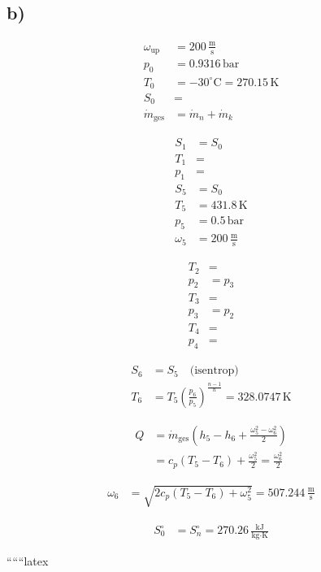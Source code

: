 

\subsection*{b)}

\begin{align*}
    \omega_{\text{up}} &= 200 \, \frac{\text{m}}{\text{s}} \\
    p_0 &= 0.9316 \, \text{bar} \\
    T_0 &= -30^\circ \text{C} = 270.15 \, \text{K} \\
    S_0 &= \\
    \dot{m}_{\text{ges}} &= \dot{m}_n + \dot{m}_k
\end{align*}

\begin{align*}
    S_1 &= S_0 \\
    T_1 &= \\
    p_1 &= \\
    S_5 &= S_0 \\
    T_5 &= 431.8 \, \text{K} \\
    p_5 &= 0.5 \, \text{bar} \\
    \omega_5 &= 200 \, \frac{\text{m}}{\text{s}}
\end{align*}

\begin{align*}
    T_2 &= \\
    p_2 &= p_3 \\
    T_3 &= \\
    p_3 &= p_2 \\
    T_4 &= \\
    p_4 &= 
\end{align*}

\begin{align*}
    S_6 &= S_5 \quad \text{(isentrop)} \\
    T_6 &= T_5 \left( \frac{p_6}{p_5} \right)^{\frac{n-1}{n}} = 328.0747 \, \text{K}
\end{align*}

\begin{align*}
    Q &= \dot{m}_{\text{ges}} \left( h_5 - h_6 + \frac{\omega_5^2 - \omega_6^2}{2} \right) \\
    &= c_p (T_5 - T_6) + \frac{\omega_5^2}{2} = \frac{\omega_6^2}{2}
\end{align*}

\begin{align*}
    \omega_6 &= \sqrt{2 c_p (T_5 - T_6) + \omega_5^2} = 507.244 \, \frac{\text{m}}{\text{s}}
\end{align*}

\begin{align*}
    S_0^\circ &= S_n^\circ = 270.26 \, \frac{\text{kJ}}{\text{kg} \cdot \text{K}}
\end{align*}

``````latex
